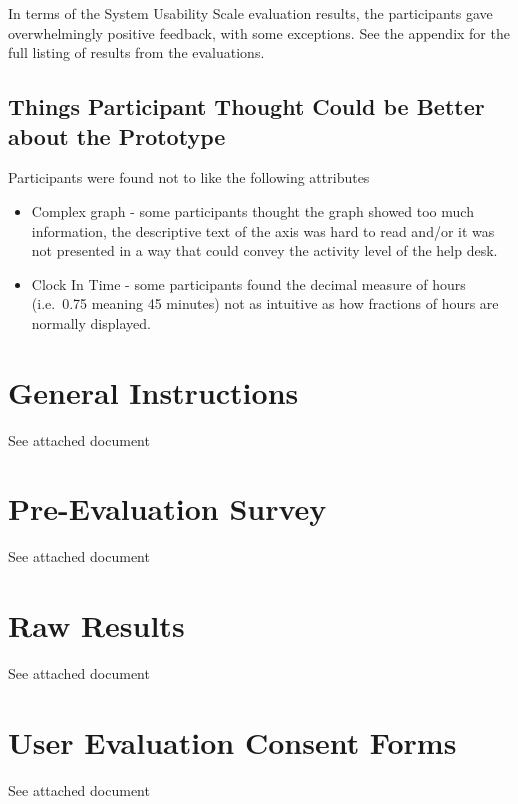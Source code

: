 \documentclass[12pt,a4paper,]{article}
\providecommand{\tightlist}{%
  \setlength{\itemsep}{0pt}\setlength{\parskip}{0pt}}
\begin{document}
In terms of the System Usability Scale evaluation results, the
participants gave overwhelmingly positive feedback, with some
exceptions. See the appendix for the full listing of results from the
evaluations.

\subsection{Things Participant Thought Could be Better about the
Prototype}\label{things-participant-thought-could-be-better-about-the-prototype}

Participants were found not to like the following attributes

\begin{itemize}
\tightlist
\item
  Complex graph - some participants thought the graph showed too much
  information, the descriptive text of the axis was hard to read and/or
  it was not presented in a way that could convey the activity level of
  the help desk.
\item
  Clock In Time - some participants found the decimal measure of hours
  (i.e.~0.75 meaning 45 minutes) not as intuitive as how fractions of
  hours are normally displayed.
\end{itemize}

\appendix

\newpage

\section{General Instructions}

See attached document




\section{Pre-Evaluation Survey}

See attached document




\section{Raw Results}

See attached document




\section{User Evaluation Consent Forms}

See attached document



\end{document}
